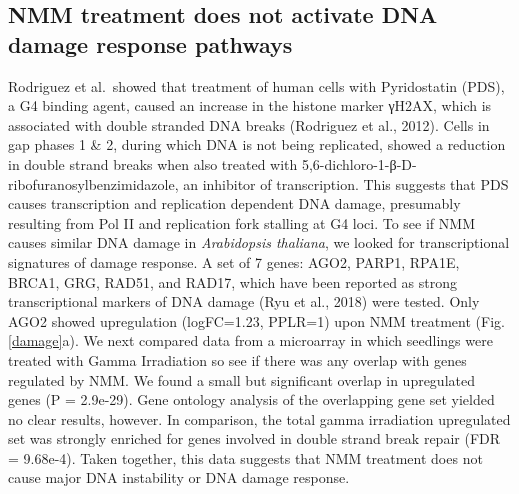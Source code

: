 \documentclass[12pt,a4paper,]{report}
\let\origfigure=\figure
\let\endorigfigure=\endfigure
\renewenvironment{figure}[1][2] {
    \expandafter\origfigure\expandafter[H]
} {
    \endorigfigure
}
\begin{document}
\begin{figure}[htbp]
\end{figure}

\newpage

\hypertarget{nmm-treatment-does-not-activate-dna-damage-response-pathways}{%
\subsection{NMM treatment does not activate DNA damage response
pathways}\label{nmm-treatment-does-not-activate-dna-damage-response-pathways}}

Rodriguez et al.~showed that treatment of human cells with Pyridostatin
(PDS), a G4 binding agent, caused an increase in the histone marker
γH2AX, which is associated with double stranded DNA breaks (Rodriguez et
al., 2012). Cells in gap phases 1 \& 2, during which DNA is not being
replicated, showed a reduction in double strand breaks when also treated
with 5,6-dichloro-1-β-D-ribofuranosylbenzimidazole, an inhibitor of
transcription. This suggests that PDS causes transcription and
replication dependent DNA damage, presumably resulting from Pol II and
replication fork stalling at G4 loci. To see if NMM causes similar DNA
damage in \emph{Arabidopsis thaliana}, we looked for transcriptional
signatures of damage response. A set of 7 genes: AGO2, PARP1, RPA1E,
BRCA1, GRG, RAD51, and RAD17, which have been reported as strong
transcriptional markers of DNA damage (Ryu et al., 2018) were tested.
Only AGO2 showed upregulation (logFC=1.23, PPLR=1) upon NMM treatment
(Fig. \ref{damage}a). We next compared data from a microarray in which
seedlings were treated with Gamma Irradiation so see if there was any
overlap with genes regulated by NMM. We found a small but significant
overlap in upregulated genes (P = 2.9e-29). Gene ontology analysis of
the overlapping gene set yielded no clear results, however. In
comparison, the total gamma irradiation upregulated set was strongly
enriched for genes involved in double strand break repair (FDR =
9.68e-4). Taken together, this data suggests that NMM treatment does not
cause major DNA instability or DNA damage response.

\newpage
\end{document}

